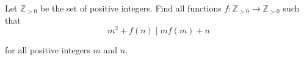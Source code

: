 Let 
$\mathbb{Z} _{>0}$
 be the set of positive integers. Find all functions  
$f: \mathbb{Z} _{>0}\rightarrow \mathbb{Z} _{>0}$
 such that
\[ m^2 + f(n) \mid mf(m) +n \]


for all positive integers 
$m$
 and 
$n$.
